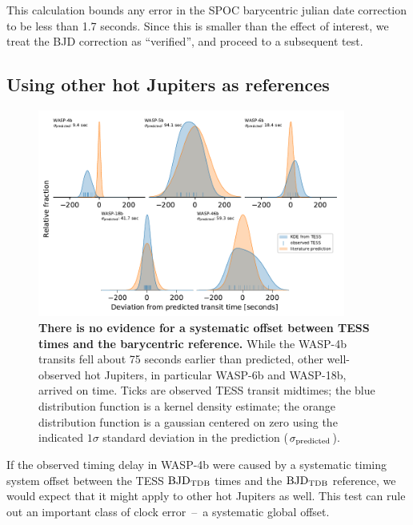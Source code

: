 \documentclass[12pt,twocolumn,tighten]{aastex62}
\begin{document}
This calculation bounds any error in the SPOC barycentric julian date
correction to be less than 1.7 seconds.  Since this is smaller than
the effect of interest, we treat the BJD correction as ``verified'',
and proceed to a subsequent test.


\subsection{Using other hot Jupiters as references}
\label{sec:hj_verification}

\begin{figure}[ht!]
  \begin{center}
    \leavevmode
    \includegraphics[width=0.9\textwidth]{f6.pdf}
  \end{center}
  \vspace{-0.5cm}
  \caption{
    {\bf There is no evidence for a systematic offset between TESS
    times and the barycentric reference.}
    While the WASP-4b transits fell about 75 seconds earlier than
    predicted, other well-observed hot Jupiters, in particular WASP-6b
    and WASP-18b, arrived on time.  Ticks are observed TESS transit
    midtimes; the blue distribution function is a kernel density
    estimate; the orange distribution function is a gaussian centered
    on zero using the indicated $1\sigma$ standard deviation in the
    prediction
    ($\sigma_{\rm predicted}$).
    \label{fig:hjs}
  }
\end{figure}

If the observed timing delay in WASP-4b were caused by a systematic
timing system offset between the TESS ${\rm BJD}_{\rm TDB}$ times and
the ${\rm BJD}_{\rm TDB}$ reference, we would expect that it might
apply to other hot Jupiters as well.  This test can rule out an
important class of clock error~--~a systematic global offset.
\end{document}
